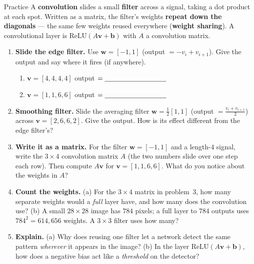 \documentclass[10pt]{article}
\newcommand{\vv}{\mathbf{v}}
\newcommand{\bb}{\mathbf{b}}
\newcommand{\ww}{\mathbf{w}}
\newcommand{\relu}{\mathrm{ReLU}}
\begin{document}
\namedateperiod

\vspace{0.12in}

\begin{notesbox}{Practice}
A \textbf{convolution} slides a small \textbf{filter} across a signal, taking a dot product at each spot. Written
as a matrix, the filter's weights \textbf{repeat down the diagonals} --- the same few weights reused everywhere
(\textbf{weight sharing}). A convolutional layer is $\relu(A\vv+\bb)$ with $A$ a convolution matrix.

\begin{enumerate}[leftmargin=1.9em, itemsep=11pt]
  \item \textbf{Slide the edge filter.} Use $\ww=[-1,1]$ (output $=-v_i+v_{i+1}$). Give the output and say
        where it fires (if anywhere).
    \begin{enumerate}[label=(\alph*), leftmargin=1.8em, itemsep=4pt]
      \item $\vv=[4,4,4,4]$ \hfill output $=\underline{\hspace{3.2cm}}$
      \item $\vv=[1,1,6,6]$ \hfill output $=\underline{\hspace{3.2cm}}$
    \end{enumerate}
    \vspace{0.5cm}
  \item \textbf{Smoothing filter.} Slide the averaging filter $\ww=\tfrac12[1,1]$
        (output $=\tfrac{v_i+v_{i+1}}{2}$) across $\vv=[2,6,6,2]$. Give the output. How is its effect
        different from the edge filter's? 
  \item \textbf{Write it as a matrix.} For the filter $\ww=[-1,1]$ and a length-$4$ signal, write the
        $3\times4$ convolution matrix $A$ (the two numbers slide over one step each row). Then compute
        $A\vv$ for $\vv=[1,1,6,6]$. What do you notice about the weights in $A$? 
  \item \textbf{Count the weights.} (a) For the $3\times4$ matrix in problem~3, how many separate weights
        would a \emph{full} layer have, and how many does the convolution use? (b) A small $28\times28$ image
        has $784$ pixels; a full layer to $784$ outputs uses $784^2=614{,}656$ weights. A $3\times3$ filter
        uses how many? 
  \item \textbf{Explain.} (a) Why does reusing one filter let a network detect the same pattern \emph{wherever}
        it appears in the image? (b) In the layer $\relu(A\vv+\bb)$, how does a negative bias act like a
        \emph{threshold} on the detector? 
\end{enumerate}
\end{notesbox}
\end{document}

